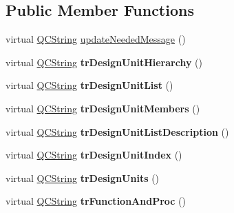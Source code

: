 \subsection*{Public Member Functions}
\begin{DoxyCompactItemize}
\item 
virtual \mbox{\hyperlink{class_q_c_string}{Q\+C\+String}} \mbox{\hyperlink{class_translator_adapter__1__8__15_a80d2ab2af345124fee8267ad82ac51ed}{update\+Needed\+Message}} ()
\item 
\mbox{\label{class_translator_adapter__1__8__15_ac75df3dcedb867b8b4f69b068f9eed3f}} 
virtual \mbox{\hyperlink{class_q_c_string}{Q\+C\+String}} {\bfseries tr\+Design\+Unit\+Hierarchy} ()
\item 
\mbox{\label{class_translator_adapter__1__8__15_a796e705bc47422e3ed6aa5a5516982a4}} 
virtual \mbox{\hyperlink{class_q_c_string}{Q\+C\+String}} {\bfseries tr\+Design\+Unit\+List} ()
\item 
\mbox{\label{class_translator_adapter__1__8__15_ade34417b0fd91d692ade66cdb57fce70}} 
virtual \mbox{\hyperlink{class_q_c_string}{Q\+C\+String}} {\bfseries tr\+Design\+Unit\+Members} ()
\item 
\mbox{\label{class_translator_adapter__1__8__15_a648bd523aae5be301ce2aa903dfc2957}} 
virtual \mbox{\hyperlink{class_q_c_string}{Q\+C\+String}} {\bfseries tr\+Design\+Unit\+List\+Description} ()
\item 
\mbox{\label{class_translator_adapter__1__8__15_acbf7171384dd4c4000d6fb4579ce5416}} 
virtual \mbox{\hyperlink{class_q_c_string}{Q\+C\+String}} {\bfseries tr\+Design\+Unit\+Index} ()
\item 
\mbox{\label{class_translator_adapter__1__8__15_a6731e8fea09749da9af90e6d41ad6f23}} 
virtual \mbox{\hyperlink{class_q_c_string}{Q\+C\+String}} {\bfseries tr\+Design\+Units} ()
\item 
\mbox{\label{class_translator_adapter__1__8__15_a5cd470c88201d944dcb428eedc6a5e83}} 
virtual \mbox{\hyperlink{class_q_c_string}{Q\+C\+String}} {\bfseries tr\+Function\+And\+Proc} ()

\end{DoxyCompactItemize}
